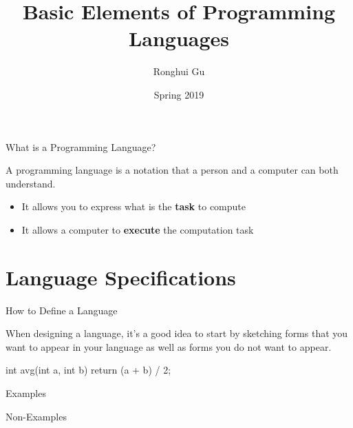 \documentclass{plt}
\title{Basic Elements of Programming Languages}
\author{Ronghui Gu}
\institute{Columbia University}
\date{Spring 2019}
\begin{document}
\frame{\titlepage
}

\begin{frame}[fragile]{What is a Programming Language?}

A programming language is a notation that  a person and a computer can both understand.
\begin{itemize}

\item It allows you to express what is the \textbf{task} to compute

\item It allows a computer to \textbf{execute} the computation task

\end{itemize}

\end{frame}

\part{Language Specifications}


\begin{frame}[fragile]{How to Define a Language}

When designing a language, it's a good idea to start by sketching forms that you want to appear in your language as well as forms you do not want to appear.

\vspace{20pt}

\begin{minipage}{0.5\textwidth}
\begin{C}
int avg(int a, int b)
{
  return (a + b) / 2;
}
\end{C}
Examples
\end{minipage}\hspace{10pt}
\begin{minipage}{0.4\textwidth}
\begin{C}
a int vg(int a,
{
  return (a; + b) 
{ {
\end{C}
Non-Examples
\end{minipage}


\end{frame}
\end{document}
